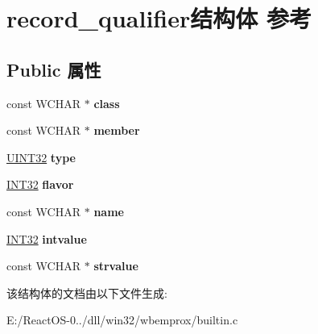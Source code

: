 \hypertarget{structrecord__qualifier}{}\section{record\+\_\+qualifier结构体 参考}
\label{structrecord__qualifier}
\subsection*{Public 属性}
\begin{DoxyCompactItemize}
\item 
\mbox{\label{structrecord__qualifier_a27dcafa1d50220c61d91d1234724d0d1}} 
const W\+C\+H\+AR $\ast$ {\bfseries class}
\item 
\mbox{\label{structrecord__qualifier_a4de3d3d92ad435e150e091354f7d7079}} 
const W\+C\+H\+AR $\ast$ {\bfseries member}
\item 
\mbox{\label{structrecord__qualifier_abd2eba2b43b8b3c42a607350e0c3c7a5}} 
\hyperlink{_processor_bind_8h_ae1e6edbbc26d6fbc71a90190d0266018}{U\+I\+N\+T32} {\bfseries type}
\item 
\mbox{\label{structrecord__qualifier_ae2e8ea542615a6c2d4904baac38efa3a}} 
\hyperlink{_processor_bind_8h_a1137216524060afd426c34677fed058b}{I\+N\+T32} {\bfseries flavor}
\item 
\mbox{\label{structrecord__qualifier_aaa0dfcc5355e05372011f31e75c57c57}} 
const W\+C\+H\+AR $\ast$ {\bfseries name}
\item 
\mbox{\label{structrecord__qualifier_aa2fd6351e0786a5e3886ccd5618cc57e}} 
\hyperlink{_processor_bind_8h_a1137216524060afd426c34677fed058b}{I\+N\+T32} {\bfseries intvalue}
\item 
\mbox{\label{structrecord__qualifier_a9005e534be01a80c179961848b8ccea9}} 
const W\+C\+H\+AR $\ast$ {\bfseries strvalue}
\end{DoxyCompactItemize}


该结构体的文档由以下文件生成\+:\begin{DoxyCompactItemize}
\item 
E\+:/\+React\+O\+S-\/0../dll/win32/wbemprox/builtin.\+c\end{DoxyCompactItemize}
